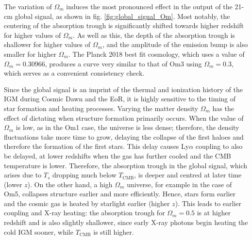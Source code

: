 \documentclass[floats,floatfix,showpacs,amssymb,prd,superscriptaddress,nofootinbib]{revtex4-2} %
\begin{document}
The variation of $\Omega_m$ induces the most pronounced effect in the output of the 21-cm global signal, as shown in fig. \ref{fig:global_signal_Om}. Most notably, the centering of the absorption trough is significantly shifted towards higher redshift for higher values of $\Omega_m$. As well as this, the depth of the absorption trough is shallower for higher values of $\Omega_m$, and the amplitude of the emission bump is also smaller for higher $\Omega_m$. The Planck 2018 best fit cosmology, which uses a value of $\Omega_m = 0.30966$, produces a curve very similar to that of Om3 using $\Omega_m = 0.3$, which serves as a convenient consistency check. 




Since the global signal is an imprint of the thermal and ionization history of the IGM during Cosmic Dawn and the EoR, it is highly sensitive to the timing of star formation and heating processes. Varying the matter density $\Omega_m$ has the effect of dictating when structure formation primarily occurs. When the value of $\Omega_m$ is low, as in the Om1 case, the universe is less dense; therefore, the density fluctuations take more time to grow, delaying the collapse of the first haloes and therefore the formation of the first stars. This delay causes Ly$\alpha$ coupling to also be delayed, at lower redshifts when the gas has further cooled and the CMB temperature is lower. Therefore, the absorption trough in the global signal, which arises due to $T_s$ dropping much below $T_\text{CMB}$, is deeper and centred at later time (lower $z$). On the other hand, a high $\Omega_m$ universe, for example in the case of Om5, collapses structure earlier and more efficiently. Hence, stars form earlier and the cosmic gas is heated by starlight earlier (higher $z$). This leads to earlier coupling and X-ray heating: the absorption trough for $\Omega_m = 0.5$ is at higher redshift and is also slightly shallower, since early X-ray photons begin heating the cold IGM sooner, while $T_\text{CMB}$ is still higher. 
\end{document}
